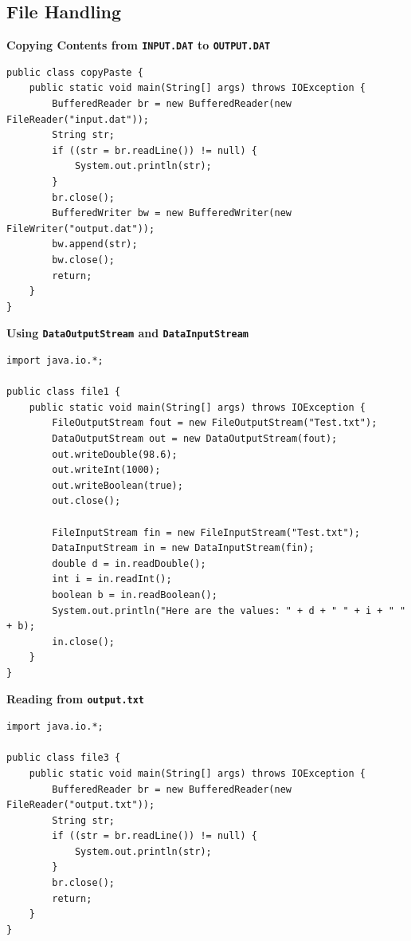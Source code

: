 \documentclass{book}
\begin{document}
\subsection{File Handling}

\textbf{Copying Contents from \texttt{INPUT.DAT} to \texttt{OUTPUT.DAT}}

\begin{verbatim}
public class copyPaste {
    public static void main(String[] args) throws IOException {
        BufferedReader br = new BufferedReader(new FileReader("input.dat"));
        String str;
        if ((str = br.readLine()) != null) {
            System.out.println(str);
        }
        br.close();
        BufferedWriter bw = new BufferedWriter(new FileWriter("output.dat"));
        bw.append(str);
        bw.close();
        return;
    }
}
\end{verbatim}

\textbf{Using \texttt{DataOutputStream} and \texttt{DataInputStream}}

\begin{verbatim}
import java.io.*;

public class file1 {
    public static void main(String[] args) throws IOException {
        FileOutputStream fout = new FileOutputStream("Test.txt");
        DataOutputStream out = new DataOutputStream(fout);
        out.writeDouble(98.6);
        out.writeInt(1000);
        out.writeBoolean(true);
        out.close();
        
        FileInputStream fin = new FileInputStream("Test.txt");
        DataInputStream in = new DataInputStream(fin);
        double d = in.readDouble();
        int i = in.readInt();
        boolean b = in.readBoolean();
        System.out.println("Here are the values: " + d + " " + i + " " + b);
        in.close();
    }
}
\end{verbatim}

\textbf{Reading from \texttt{output.txt}}

\begin{verbatim}
import java.io.*;

public class file3 {
    public static void main(String[] args) throws IOException {
        BufferedReader br = new BufferedReader(new FileReader("output.txt"));
        String str;
        if ((str = br.readLine()) != null) {
            System.out.println(str);
        }
        br.close();
        return;
    }
}
\end{verbatim}
\end{document}

